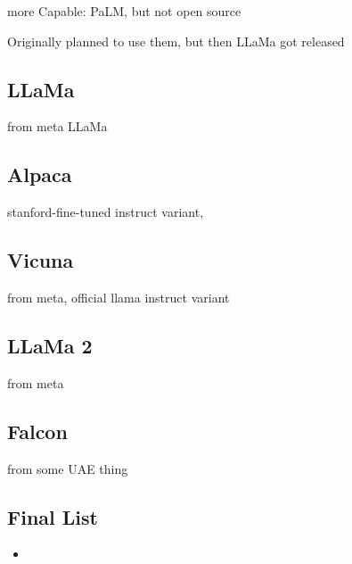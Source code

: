 more Capable: PaLM, but not open source

Originally planned to use them, but then LLaMa got released
\subsection{LLaMa}\label{sub:llama}
from meta
LLaMa \cite{touvron_llama_2023}
\subsection{Alpaca}\label{sub:alpaca}
stanford-fine-tuned instruct variant, 
\subsection{Vicuna}\label{sub:vicuna}
from meta, official llama instruct variant
\subsection{LLaMa 2}\label{sub:llama2}
from meta
\subsection{Falcon}\label{sub:falcon}
from some UAE thing

\subsection{Final List}\label{sub:list}
\begin{itemize}
    \item 
\end{itemize}


